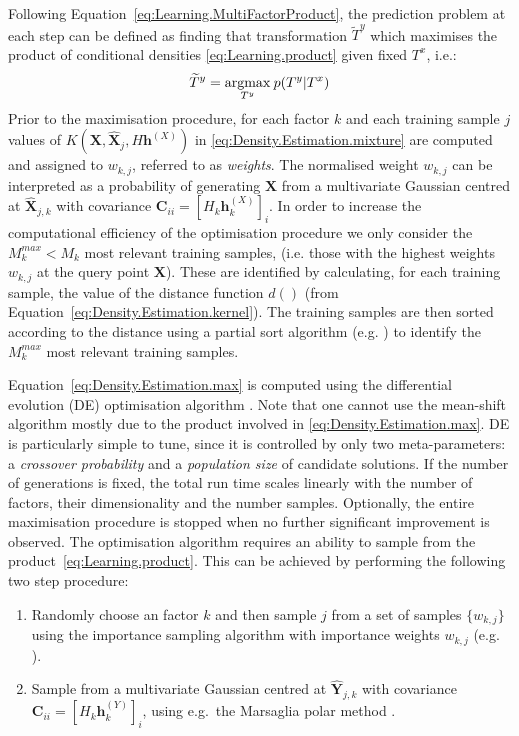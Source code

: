 Following Equation~\eqref{eq:Learning.MultiFactorProduct},
the prediction problem at each step can be defined as finding that
transformation $\widetilde{T}^y$ which maximises the product of conditional densities
\eqref{eq:Learning.product} given fixed $T^x$, i.e.:
\begin{equation}
\widetilde{T}^y = \argmax{T^y} p(T^y|T^x)
\label{eq:Density.Estimation.max}
\end{equation}
Prior to the maximisation procedure, for each factor $k$
and each training sample $j$ values of 
$K(\mathbf{X}, \hat{\mathbf{X}}_j, H \mathbf{h}^{(X)})$
in \eqref{eq:Density.Estimation.mixture} are computed and assigned
to $w_{k,j}$, referred to as \textit{weights}.
The normalised weight $w_{k,j}$ can be interpreted as a probability of
generating $\mathbf{X}$ from a multivariate Gaussian centred at $\hat{\mathbf{X}}_{j,k}$
with covariance $\mathbf{C}_{ii} = [H_k \mathbf{h}^{(X)}_k]_i$.
In order to increase the computational efficiency of the optimisation procedure
we only consider the $M^{max}_k < M_k$ most relevant training samples,
(i.e. those with the highest weights $w_{k,j}$ at the query point $\mathbf{X}$).
These are identified by calculating, for each training sample, the value
of the distance function $d()$ (from Equation~\eqref{eq:Density.Estimation.kernel}).
The training samples are then sorted according to the distance using a
partial sort algorithm (e.g. \cite{knuth_searching_1998})
to identify the $M^{max}_k$ most relevant training samples.

Equation~\eqref{eq:Density.Estimation.max} is computed using the
differential evolution (DE) optimisation algorithm \cite{storn_differential_1997}.
Note that one cannot use the mean-shift algorithm \cite{cheng_mean_1995}
mostly due to the product involved in \eqref{eq:Density.Estimation.max}.
DE is particularly simple to tune, since it is controlled by only
two meta-parameters: a \textit{crossover probability}
and a \textit{population size} of candidate solutions.
If the number of generations is fixed,
the total run time scales linearly with the number of factors,
their dimensionality and the number samples.
Optionally, the entire maximisation procedure is stopped when
no further significant improvement is observed.
The optimisation algorithm requires an ability to sample from the
product~\eqref{eq:Learning.product}.
This can be achieved by performing the following two step procedure:

\begin{enumerate}
\item Randomly choose an factor $k$ and then sample $j$ from
a set of samples $\{w_{k,j}\}$ using the importance sampling algorithm
with importance weights $w_{k,j}$ (e.g. \cite{bishop_pattern_2006}).
\item Sample from a multivariate Gaussian centred at $\hat{\mathbf{Y}}_{j,k}$ with
covariance $\mathbf{C}_{ii} = [H_k \mathbf{h}^{(Y)}_k]_i$, using
e.g.\ the Marsaglia polar method \cite{marsaglia_convenient_1964}.
\end{enumerate}

